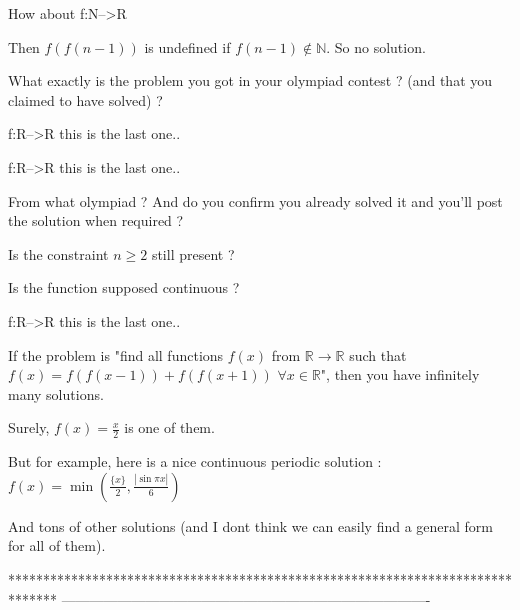 \begin{solution}
	\begin{tcolorbox}How about f:N-->R\end{tcolorbox}
Then $f(f(n-1))$ is undefined if $f(n-1)\notin\mathbb N$. So no solution.

What exactly is the problem you got in your olympiad contest ? (and that you claimed to have solved) ?
\end{solution}



\begin{solution}
	f:R-->R
this is the last one..
\end{solution}



\begin{solution}
	\begin{tcolorbox}f:R-->R
this is the last one..\end{tcolorbox}
From what olympiad ?
And do you confirm you already solved it and you'll post the solution when required ?

Is the constraint $n\ge 2$ still present ?

Is the function supposed continuous ?
\end{solution}



\begin{solution}
	\begin{tcolorbox}f:R-->R
this is the last one..\end{tcolorbox}
If the problem is "find all functions $f(x)$ from $\mathbb R\to\mathbb R$ such that $f(x)=f(f(x-1))+f(f(x+1))$ $\forall x\in\mathbb R$", then you have infinitely many solutions.

Surely, $f(x)=\frac x2$ is one of them.

But for example, here is a nice continuous periodic solution : $f(x)=\min(\frac{\{x\}}2,\frac{|\sin \pi x|}6)$

And tons of other solutions (and I dont think we can easily find a general form for all of them).
\end{solution}
*******************************************************************************
-------------------------------------------------------------------------------

